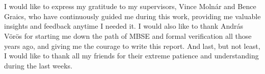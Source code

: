 \chapter*{\koszonetnyilvanitas}

I would like to express my gratitude to my supervisors, Vince Molnár and Bence Graics, who have continuously guided me during this work, providing me valuable insights and feedback anytime I needed it. I would also like to thank András Vörös for starting me down the path of MBSE and formal verification all those years ago, and giving me the courage to write this report. And last, but not least, I would like to thank all my friends for their extreme patience and understanding during the last weeks.